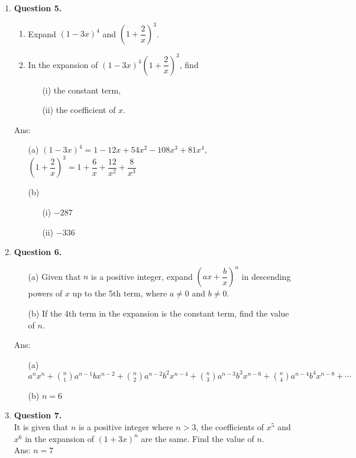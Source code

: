 \documentclass[12pt]{article}
\begin{document}
\begin{enumerate}
	\item {\bf Question 5.}
	\begin{enumerate}
		\item Expand $(1-3x)^4$ and $\left(1 + \dfrac{2}{x}\right)^3$.
		\item In the expansion of $(1-3x)^4\left( 1+ \dfrac{2}{x}\right)^3$, find
		\begin{enumerate}
			\item [(i)] the constant term,
			\item [(ii)] the coefficient of $x$.
		\end{enumerate}
	\end{enumerate}
	Ans:
	\begin{enumerate}
		\item [(a)] $(1-3x)^4 = 1 - 12x + 54x^2 - 108x^3 + 81x^4 $,\\
		$\left(1 + \dfrac{2}{x}\right)^3 = 1 + \dfrac{6}{x}+ \dfrac{12}{x^2}+ \dfrac{8}{x^3}$
		\item [(b)]
		\begin{enumerate}
			\item [(i)] $-287$
			\item [(ii)] $-336$
		\end{enumerate}
	\end{enumerate}

	\item {\bf Question 6.}
	\begin{enumerate}
		\item [(a)]Given that $n$ is a positive integer, expand $\left(ax + \dfrac{b}{x}\right)^n$ in descending powers of $x$ up to the 5th term, where $a\neq 0$ and $b\neq 0$.
		\item [(b)] If the 4th term in the expansion is the constant term, find the value of $n$.
	\end{enumerate}
	Ans:
	\begin{enumerate}
		\item [(a)] $a^nx^n + \binom{n}{1}a^{n-1}bx^{n-2}+ \binom{n}{2}a^{n-2}b^2x^{n-4}+ \binom{n}{3}a^{n-3}b^3x^{n-6}+ \binom{n}{4}a^{n-4}b^4x^{n-8} + \cdots$
		\item [(b)] $n = 6$
	\end{enumerate}

	\item {\bf Question 7.}\\
	It is given that $n$ is a positive integer where $n>3$, the coefficients of $x^5$ and $x^6$ in the expansion of $(1+3x)^n$ are the same. Find the value of $n$. \\
	Ans: $n = 7$


\end{enumerate}
\end{document}
